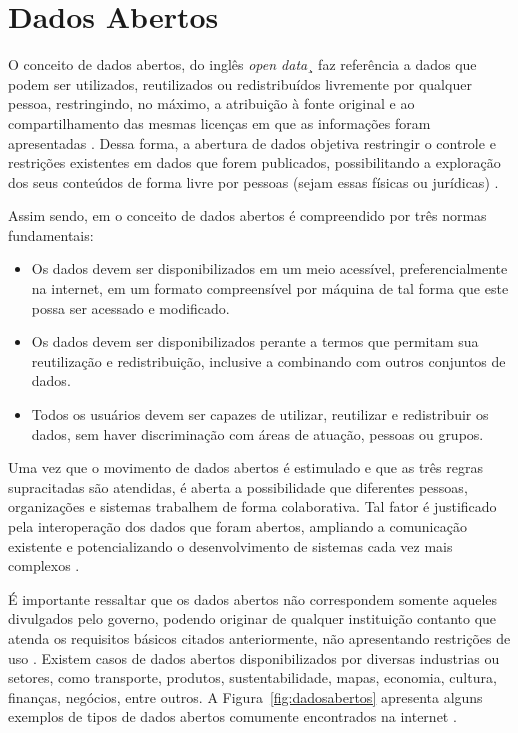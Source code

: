 \section{Dados Abertos}

O conceito de dados abertos, do inglês \textit{open data}¸ faz referência a dados que podem ser utilizados, reutilizados ou redistribuídos livremente por qualquer pessoa, restringindo, no máximo, a atribuição à fonte original e ao compartilhamento das mesmas licenças em que as informações foram apresentadas \cite{cap02_ref25}. Dessa forma, a abertura de dados objetiva restringir o controle e restrições existentes em dados que forem publicados, possibilitando a exploração dos seus conteúdos de forma livre por pessoas (sejam essas físicas ou jurídicas) \cite{cap02_ref24}. 

Assim sendo, em \cite{cap02_ref26} o conceito de dados abertos é compreendido por três normas fundamentais:

\begin{itemize}
    \item Os dados devem ser disponibilizados em um meio acessível, preferencialmente na internet, em um formato compreensível por máquina de tal forma que este possa ser acessado e modificado.
    
    \item Os dados devem ser disponibilizados perante a termos que permitam sua reutilização e redistribuição, inclusive a combinando com outros conjuntos de dados.
    
    \item Todos os usuários devem ser capazes de utilizar, reutilizar e redistribuir os dados, sem haver discriminação com áreas de atuação, pessoas ou grupos.
\end{itemize}

Uma vez que o movimento de dados abertos é estimulado e que as três regras supracitadas são atendidas, é aberta a possibilidade que diferentes pessoas, organizações e sistemas trabalhem de forma colaborativa. Tal fator é justificado pela interoperação dos dados que foram abertos, ampliando a comunicação existente e potencializando o desenvolvimento de sistemas cada vez mais complexos \cite{cap02_ref24}.

É importante ressaltar que os dados abertos não correspondem somente aqueles divulgados pelo governo, podendo originar de qualquer instituição contanto que atenda os requisitos básicos citados anteriormente, não apresentando restrições de uso \cite{cap02_ref37}. Existem casos de dados abertos disponibilizados por diversas industrias ou setores, como transporte, produtos, sustentabilidade, mapas, economia, cultura, finanças, negócios, entre outros. A Figura~\ref{fig:dadosabertos} apresenta alguns exemplos de tipos de dados abertos comumente encontrados na internet \cite{cap02_ref36}.

